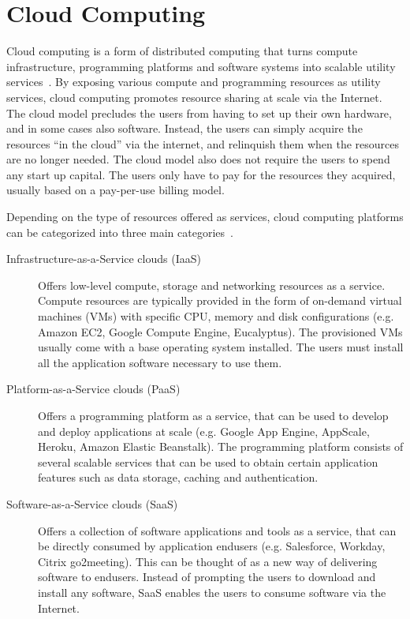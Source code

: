 \section{Cloud Computing}

Cloud computing is a form of distributed computing that turns compute infrastructure, programming
platforms and software systems into scalable utility services~\cite{hassan2011demystifying,Mell:2011:SND:2206223}. 
By exposing various compute and programming
resources as utility services, cloud computing promotes resource sharing at scale via the Internet.
The cloud model precludes the users from having to set up their own hardware, and in some cases also software. Instead,
the users can simply acquire the resources ``in the cloud'' via the internet, and relinquish them when
the resources are no longer needed. The cloud model also does not require the users to spend any start up
capital. The users only have to pay for the resources they acquired, usually based on a pay-per-use
billing model.

Depending on the type of resources
offered as services, cloud computing platforms can be categorized into three main categories~\cite{Mell:2011:SND:2206223}.
\begin{description}
\item [Infrastructure-as-a-Service clouds (IaaS)]
Offers low-level compute, storage and networking
resources as a service. Compute resources are typically provided in the form of on-demand virtual machines (VMs)
with specific CPU, memory and disk configurations (e.g. Amazon EC2, Google Compute Engine, Eucalyptus). 
The provisioned VMs usually come with a base operating system installed. The users must install all the application software
necessary to use them.
\item [Platform-as-a-Service clouds (PaaS)]
Offers a programming platform as a service, that can be used to develop and deploy applications at scale 
(e.g. Google App Engine, AppScale, Heroku, Amazon Elastic Beanstalk). The programming platform consists
of several scalable services that can be used to obtain certain application features such as data storage, caching
and authentication.
\item [Software-as-a-Service clouds (SaaS)]
Offers a collection of software applications and tools as a service, that can be directly consumed by
application endusers (e.g. Salesforce, Workday, Citrix go2meeting). This can be thought of as a new way 
of delivering software to
endusers. Instead of prompting the users to download and install any software, SaaS enables the users
to consume software via the Internet.  
\end{description}

